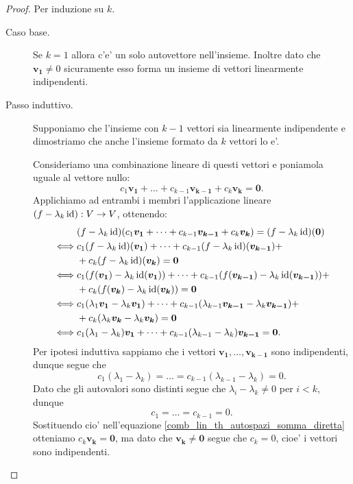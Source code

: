 \begin{proof}
    Per induzione su $k$.
    \begin{description}
        \item[Caso base.] Se $k = 1$ allora c'e' un solo autovettore nell'insieme. Inoltre dato che $\bm{v_1} \neq 0$ sicuramente esso forma un insieme di vettori linearmente indipendenti.
        \item[Passo induttivo.] Supponiamo che l'insieme con $k-1$ vettori sia linearmente indipendente e dimostriamo che anche l'insieme formato da $k$ vettori lo e'.
        
        Consideriamo una combinazione lineare di questi vettori e poniamola uguale al vettore nullo: \begin{equation} \label{comb_lin_th_autospazi_somma_diretta}
            c_1\bm{v_1} + \dots + c_{k-1}\bm{v_{k-1}} + c_k\bm{v_k} = \bm 0.
        \end{equation}
        Applichiamo ad entrambi i membri l'applicazione lineare $(f - \lambda_k\operatorname{id}) : V \to V$, ottenendo:
        \begin{alignat*}
            {1}
            &(f - \lambda_k\operatorname{id})(c_1\bm{v_1} + \dots + c_{k-1}\bm{v_{k-1}} + c_k\bm{v_k}) = (f - \lambda_k\operatorname{id})(\bm 0)\\
            \iff &c_1(f - \lambda_k\operatorname{id})(\bm{v_1}) + \dots + c_{k-1}(f - \lambda_k\operatorname{id})(\bm{v_{k-1}}) +\\
                 &+ c_k(f - \lambda_k\operatorname{id})(\bm{v_k}) = \bm 0 \\
            \iff &c_1(f(\bm{v_1}) - \lambda_k\operatorname{id}(\bm{v_1})) + \dots + c_{k-1}(f(\bm{v_{k-1}}) - \lambda_k\operatorname{id}(\bm{v_{k-1}})) +\\
                 &+ c_k(f(\bm{v_k}) - \lambda_k\operatorname{id}(\bm{v_k})) = \bm 0 \\
            \iff &c_1(\lambda_1\bm{v_1} - \lambda_k\bm{v_1}) + \dots + c_{k-1}(\lambda_{k-1}\bm{v_{k-1}} - \lambda_k\bm{v_{k-1}}) + \\
                 &+ c_k(\lambda_k\bm{v_k} - \lambda_k\bm{v_k}) = \bm 0\\
            \iff &c_1(\lambda_1 - \lambda_k)\bm{v_1} + \dots + c_{k-1}(\lambda_{k-1} - \lambda_k)\bm{v_{k-1}} = \bm 0.
        \end{alignat*}
        Per ipotesi induttiva sappiamo che i vettori $\bm{v_1}, \dots, \bm{v_{k-1}}$ sono indipendenti, dunque segue che \[
            c_1(\lambda_1 - \lambda_k) = \dots = c_{k-1}(\lambda_{k-1} - \lambda_k) = 0.
        \]
        Dato che gli autovalori sono distinti segue che $\lambda_i - \lambda_k \neq 0$ per $i < k$, dunque \[
            c_1 = \dots = c_{k-1} = 0.    
        \]
        Sostituendo cio' nell'equazione \ref{comb_lin_th_autospazi_somma_diretta} otteniamo $c_k\bm{v_k} = \bm 0$, ma dato che $\bm{v_k} \neq \bm{0}$ segue che $c_k = 0$, cioe' i vettori sono indipendenti. \qedhere
    \end{description}
\end{proof}

